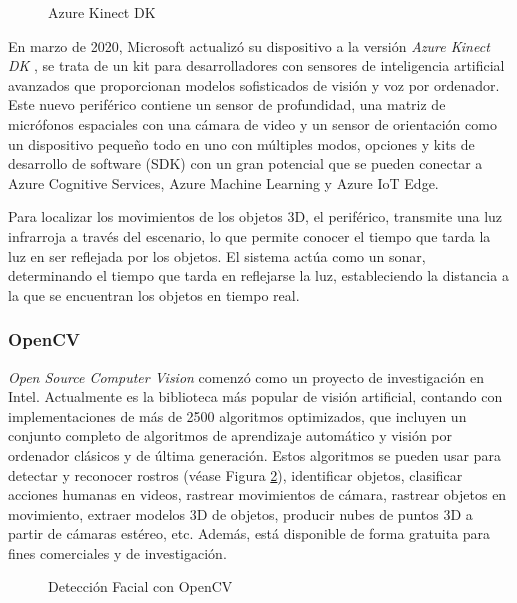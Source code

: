 \begin{figure}[h!]
    \centering
    \caption{Azure Kinect DK}
    \label{fig:AzureKinectDK}   
\end{figure}



En marzo de 2020, Microsoft actualizó su dispositivo a la versión \textit{Azure Kinect DK }\cite{AzureKinect}, se trata de un kit para desarrolladores con sensores de inteligencia artificial avanzados que proporcionan modelos sofisticados de visión y voz por ordenador. Este nuevo periférico contiene un sensor de profundidad, una matriz de micrófonos espaciales con una cámara de video y un sensor de orientación como un dispositivo pequeño todo en uno con múltiples modos, opciones y kits de desarrollo de software (SDK) con un gran potencial que se pueden conectar a Azure Cognitive Services, Azure Machine Learning y Azure IoT Edge.

Para localizar los movimientos de los objetos 3D, el periférico, transmite una luz infrarroja a través del escenario, lo que permite conocer el tiempo que tarda la luz en ser reflejada por los objetos. El sistema actúa como un sonar, determinando el tiempo que tarda en reflejarse la luz, estableciendo la distancia a la que se encuentran los objetos en tiempo real.


\subsubsection{OpenCV}

\textit{Open Source Computer Vision}\cite{OpenCV} comenzó como un proyecto de investigación en Intel. Actualmente es la biblioteca más popular de visión artificial, contando con implementaciones de más de 2500 algoritmos optimizados, que incluyen un conjunto completo de algoritmos de aprendizaje automático y visión por ordenador clásicos y de última generación. Estos algoritmos se pueden usar para detectar y reconocer rostros (véase Figura \ref{fig:OpenCV}), identificar objetos, clasificar acciones humanas en videos, rastrear movimientos de cámara, rastrear objetos en movimiento, extraer modelos 3D de objetos, producir nubes de puntos 3D a partir de cámaras estéreo, etc. Además, está disponible de forma gratuita para fines comerciales y de investigación.

\begin{figure}[h!]
    \centering
    \caption{Detección Facial con OpenCV }
    \label{fig:OpenCV}  
\end{figure}

